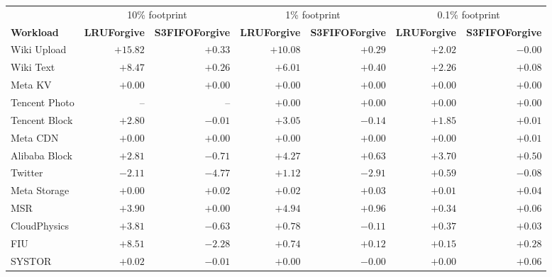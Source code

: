 \begin{tabular}{lrrrrrr}
\toprule
 & \multicolumn{2}{c}{10\% footprint} & \multicolumn{2}{c}{1\% footprint} & \multicolumn{2}{c}{0.1\% footprint} \\
\cmidrule(lr){2-3}\cmidrule(lr){4-5}\cmidrule(lr){6-7}
\textbf{Workload} & \textbf{LRUForgive} & \textbf{S3FIFOForgive} & \textbf{LRUForgive} & \textbf{S3FIFOForgive} & \textbf{LRUForgive} & \textbf{S3FIFOForgive} \\
\midrule
Wiki Upload & $+15.82$ & $+0.33$ & $+10.08$ & $+0.29$ & $+2.02$ & $-0.00$ \\
Wiki Text & $+8.47$ & $+0.26$ & $+6.01$ & $+0.40$ & $+2.26$ & $+0.08$ \\
Meta KV & $+0.00$ & $+0.00$ & $+0.00$ & $+0.00$ & $+0.00$ & $+0.00$ \\
Tencent Photo & -- & -- & $+0.00$ & $+0.00$ & $+0.00$ & $+0.00$ \\
Tencent Block & $+2.80$ & $-0.01$ & $+3.05$ & $-0.14$ & $+1.85$ & $+0.01$ \\
Meta CDN & $+0.00$ & $+0.00$ & $+0.00$ & $+0.00$ & $+0.00$ & $+0.01$ \\
Alibaba Block & $+2.81$ & $-0.71$ & $+4.27$ & $+0.63$ & $+3.70$ & $+0.50$ \\
Twitter & $-2.11$ & $-4.77$ & $+1.12$ & $-2.91$ & $+0.59$ & $-0.08$ \\
\midrule
Meta Storage & $+0.00$ & $+0.02$ & $+0.02$ & $+0.03$ & $+0.01$ & $+0.04$ \\
MSR & $+3.90$ & $+0.00$ & $+4.94$ & $+0.96$ & $+0.34$ & $+0.06$ \\
CloudPhysics & $+3.81$ & $-0.63$ & $+0.78$ & $-0.11$ & $+0.37$ & $+0.03$ \\
FIU & $+8.51$ & $-2.28$ & $+0.74$ & $+0.12$ & $+0.15$ & $+0.28$ \\
SYSTOR & $+0.02$ & $-0.01$ & $+0.00$ & $-0.00$ & $+0.00$ & $+0.06$ \\
\bottomrule
\end{tabular}
